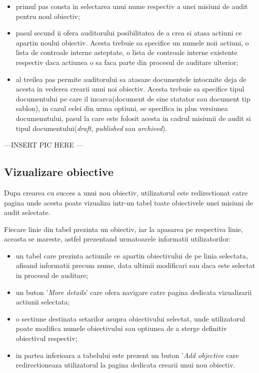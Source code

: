 \begin{itemize}
	\item primul pas consta in selectarea unui nume respectiv a unei misiuni de audit pentru noul obiectiv;
	
	\item pasul secund ii ofera auditorului posibilitatea de a crea si atasa actiuni ce apartin noului obiectiv. Acesta trebuie sa specifice un numele noii actiuni, o lista de controale interne asteptate, o lista de controale interne existente respectiv daca actiunea o sa faca parte din procesul de auditare ulterior;
	
	\item al treilea pas permite  auditorului sa atasaze documentele intocmite deja de acesta in vederea crearii unui noi obiectiv. Acesta trebuie sa specifice tipul documentului pe care il incarca(document de sine statator sau document tip sablon), in cazul celei din urma optiuni, se specifica in plus versiunea documenutului, pasul la care este folosit acesta in cadrul misiunii de audit  si tipul documentului(\textit{draft}, \textit{published} sau \textit{archived}).
\end{itemize}

---INSERT PIC HERE ---\\

\subsection*{Vizualizare obiective}
Dupa crearea cu succes a unui nou obiectiv, utilizatorul este redirectionat catre pagina unde acesta poate vizualiza intr-un tabel toate obiectivele unei misiuni de audit selectate.

Fiecare linie din tabel prezinta un obiectiv, iar la apasarea pe respectiva linie, aceasta se mareste, astfel prezentand urmatoarele informatii utilizatorilor:
	\begin{itemize}
	
		\item un tabel care prezinta actiunile ce apartin obiectivului de pe linia selectata, afisand informatii precum nume, data ultimii modificari sau daca este selectat in procesul de auditare;
		
		\item un buton '\textit{More details}' care ofera navigare catre pagina dedicata vizualizarii actiunii selectata;
		
		\item o sectiune destinata setarilor asupra obiectivului selectat, unde utilizatorul poate modifica numele obiectivului sau optiunea de a sterge definitiv obiectivul respectiv;
		
		\item in partea inferioara a tabelului este prezent un buton '\textit{Add objective} care redirectioneaza utilizatorul la pagina dedicata crearii unui nou obiectiv.
		
	
	\end{itemize}

